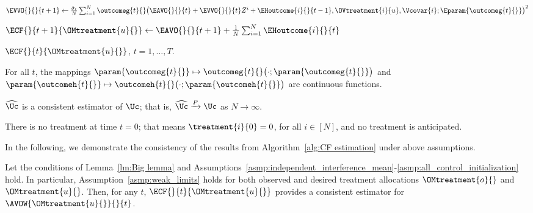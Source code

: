 \begin{algorithm}
\begin{algorithmic}
\State $\EVVO{}{}{t+1} \gets \frac{\hat{\sigma}_t}{N} \sum_{i=1}^N \outcomeg{t}{} \big(\EAVO{}{}{t} + \EVVO{}{}{t} Z^i + \EHoutcome{i}{}{t-1}, \OVtreatment{i}{u}, \Vcovar{i}; \Eparam{\outcomeg{t}{}}\big)^2$

\State $\ECF{}{t+1}{\OMtreatment{u}{}} \gets \EAVO{}{}{t+1} +  \frac{1}{N} \sum_{i=1}^N \EHoutcome{i}{}{t}$

\EndFor

\Ensure $\ECF{}{t}{\OMtreatment{u}{}}$, $t = 1, \ldots, T$.
% 
\end{algorithmic}
\end{algorithm}
% 

% 
\begin{assumption}
    \label{asmp:continuous_parameterization}
    For all $t$, the mappings $\param{\outcomeg{t}{}} \mapsto \outcomeg{t}{} \big(\cdot; \param{\outcomeg{t}{}} \big)$ and $\param{\outcomeh{t}{}} \mapsto \outcomeh{t}{} \big(\cdot; \param{\outcomeh{t}{}} \big)$ are continuous functions.
\end{assumption}
% 
\begin{assumption}
    \label{asmp:consistent_parameter_estimation}
    $\widehat{\Uc}$ is a consistent estimator of $\Uc$; that is, $\widehat{\Uc} \xrightarrow{P} \Uc$ as $N \rightarrow \infty$.
\end{assumption}
% 
\begin{assumption}
    \label{asmp:all_control_initialization}
    There is no treatment at time $t=0$; that means $\treatment{i}{0}=0$, for all $i\in[N]$, and no treatment is anticipated.
\end{assumption}
% 

In the following, we demonstrate the consistency of the results from Algorithm~\ref{alg:CF estimation} under above assumptions.
% 
\begin{theorem}[Consistency]
    \label{thm:consistency}
    Let the conditions of Lemma~\ref{lm:Big lemma} and Assumptions~\ref{asmp:independent_interference_mean}-\ref{asmp:all_control_initialization} hold. In particular, Assumption~\ref{asmp:weak_limits} holds for both observed and desired treatment allocations $\OMtreatment{o}{}$ and $\OMtreatment{u}{}$. Then, for any $t$, $\ECF{}{t}{\OMtreatment{u}{}}$ provides a consistent estimator for $\AVOW{\OMtreatment{u}{}}{}{t}$.
\end{theorem}

